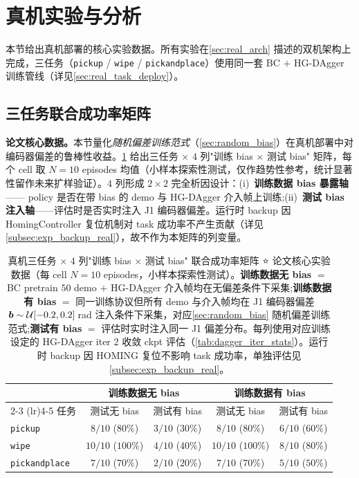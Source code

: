 \section{真机实验与分析}\label{sec:real_experiments}

本节给出真机部署的核心实验数据。所有实验在\cref{sec:real_arch} 描述的双机架构上完成，三任务（\texttt{pickup} / \texttt{wipe} / \texttt{pickandplace}）使用同一套 BC $+$ HG-DAgger 训练管线（详见\cref{sec:real_task_deploy}）。

\subsection{三任务联合成功率矩阵}\label{subsec:exp_4col_matrix}

\textbf{论文核心数据。}本节量化\emph{随机偏差训练范式}（\cref{sec:random_bias}）在真机部署中对编码器偏差的鲁棒性收益。\cref{tab:real_4col_matrix} 给出三任务 $\times$ $4$ 列"训练 bias $\times$ 测试 bias" 矩阵，每个 cell 取 $N=10$ episodes 均值（小样本探索性测试，仅作趋势性参考，统计显著性留作未来扩样验证）。$4$ 列形成 $2 \times 2$ 完全析因设计：(i)~\textbf{训练数据 bias 暴露轴}—— policy 是否在带 bias 的 demo 与 HG-DAgger 介入帧上训练;(ii)~\textbf{测试 bias 注入轴}——评估时是否实时注入 J1 编码器偏差。运行时 backup 因 HomingController 复位机制对 task 成功率不产生贡献（详见 \cref{subsec:exp_backup_real}），故不作为本矩阵的列变量。

\begin{table}[htbp]
  \centering
  \caption{真机三任务 $\times$ $4$ 列"训练 bias $\times$ 测试 bias" 联合成功率矩阵 ⭐ 论文核心实验数据（每 cell $N=10$ episodes，小样本探索性测试）。\textbf{训练数据无 bias} $=$ BC pretrain $50$ demo $+$ HG-DAgger 介入帧均在无偏差条件下采集;\textbf{训练数据有 bias} $=$ 同一训练协议但所有 demo 与介入帧均在 J1 编码器偏差 $\bm{b} \sim \mathcal{U}[-0.2, 0.2]$\,rad 注入条件下采集，对应\cref{sec:random_bias} 随机偏差训练范式;\textbf{测试有 bias} $=$ 评估时实时注入同一 J1 偏差分布。每列使用对应训练设定的 HG-DAgger iter 2 收敛 ckpt 评估（\cref{tab:dagger_iter_stats}）。运行时 backup 因 HOMING 复位不影响 task 成功率，单独评估见 \cref{subsec:exp_backup_real}。}
  \label{tab:real_4col_matrix}
  \footnotesize
  \begin{tabular}{@{}lcccc@{}}
    \toprule
     & \multicolumn{2}{c}{训练数据无 bias} & \multicolumn{2}{c}{训练数据有 bias} \\
    \cmidrule(lr){2-3} \cmidrule(lr){4-5}
    任务 & 测试无 bias & 测试有 bias & 测试无 bias & 测试有 bias \\
    \midrule
    \texttt{pickup}        & $8/10$ ($80\%$)   & $3/10$ ($30\%$) & $8/10$ ($80\%$)   & $6/10$ ($60\%$) \\
    \texttt{wipe}          & $10/10$ ($100\%$) & $4/10$ ($40\%$) & $10/10$ ($100\%$) & $8/10$ ($80\%$) \\
    \texttt{pickandplace}  & $7/10$ ($70\%$)   & $2/10$ ($20\%$) & $7/10$ ($70\%$)   & $5/10$ ($50\%$) \\
    \bottomrule
  \end{tabular}
\end{table}

